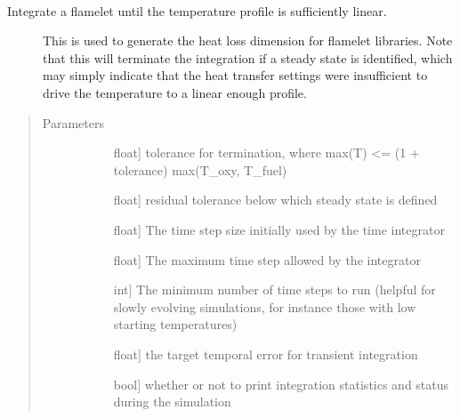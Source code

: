 \documentclass[letterpaper,10pt,english]{sphinxmanual}
\begin{document}
\begin{fulllineitems}
\begin{fulllineitems}
\label{\detokenize{spitfire.chemistry.flamelet:spitfire.chemistry.flamelet.Flamelet.integrate_for_heat_loss}}~\begin{description}
\item[{Integrate a flamelet until the temperature profile is sufficiently linear.}] \leavevmode
This is used to generate the heat loss dimension for flamelet libraries.
Note that this will terminate the integration if a steady state is identified,
which may simply indicate that the heat transfer settings were insufficient to
drive the temperature to a linear enough profile.

\end{description}
\begin{quote}\begin{description}
\item[{Parameters}] \leavevmode\begin{description}
\item[{}] \leavevmode{[}float{]}
tolerance for termination, where max(T) \textless{}= (1 + tolerance) max(T\_oxy, T\_fuel)

\item[{}] \leavevmode{[}float{]}
residual tolerance below which steady state is defined

\item[{}] \leavevmode{[}float{]}
The time step size initially used by the time integrator

\item[{}] \leavevmode{[}float{]}
The maximum time step allowed by the integrator

\item[{}] \leavevmode{[}int{]}
The minimum number of time steps to run (helpful for slowly evolving simulations, for instance those with low starting temperatures)

\item[{}] \leavevmode{[}float{]}
the target temporal error for transient integration

\item[{}] \leavevmode{[}bool{]}
whether or not to print integration statistics and status during the simulation


\end{description}
\end{description}
\end{quote}
\end{fulllineitems}
\end{fulllineitems}
\end{document}
